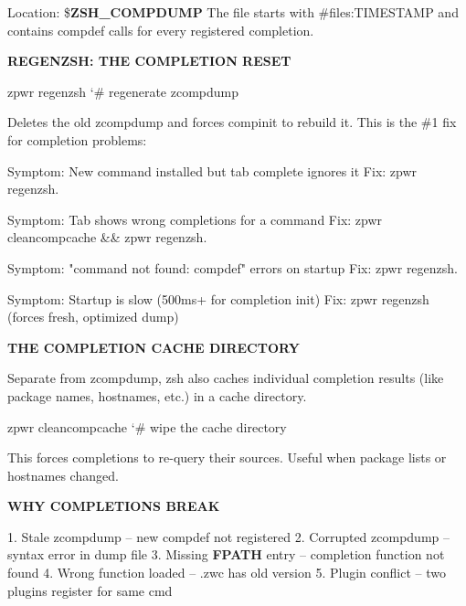 \documentclass[11pt,a4paper,twoside]{book}
\begin{document}
Location: \$\textbf{ZSH\_COMPDUMP} The file starts with \#files:TIMESTAMP and contains compdef calls for every registered completion.


\vspace{12pt}
{\bfseries\color{neonyellow} REGENZSH: THE COMPLETION RESET}\vspace{4pt}

\begin{codebox}
\color{neongreen}zpwr regenzsh                       {\char`\#} regenerate zcompdump\\
\end{codebox}

Deletes the old zcompdump and forces compinit to rebuild it. This is the \#1 fix for completion problems:

Symptom: New command installed but tab complete ignores it Fix:     zpwr regenzsh.

Symptom: Tab shows wrong completions for a command Fix:     zpwr cleancompcache \&\& zpwr regenzsh.

Symptom: "command not found: compdef" errors on startup Fix:     zpwr regenzsh.

Symptom: Startup is slow (500ms+ for completion init) Fix:     zpwr regenzsh (forces fresh, optimized dump)


\vspace{12pt}
{\bfseries\color{neonyellow} THE COMPLETION CACHE DIRECTORY}\vspace{4pt}

Separate from zcompdump, zsh also caches individual completion results (like package names, hostnames, etc.) in a cache directory.

\begin{codebox}
\color{neongreen}zpwr cleancompcache                 {\char`\#} wipe the cache directory\\
\end{codebox}

This forces completions to re-query their sources. Useful when package lists or hostnames changed.


\vspace{12pt}
{\bfseries\color{neonyellow} WHY COMPLETIONS BREAK}\vspace{4pt}

1. Stale zcompdump -- new compdef not registered 2. Corrupted zcompdump -- syntax error in dump file 3. Missing \textbf{FPATH} entry -- completion function not found 4. Wrong function loaded -- .zwc has old version 5. Plugin conflict -- two plugins register for same cmd
\end{document}
